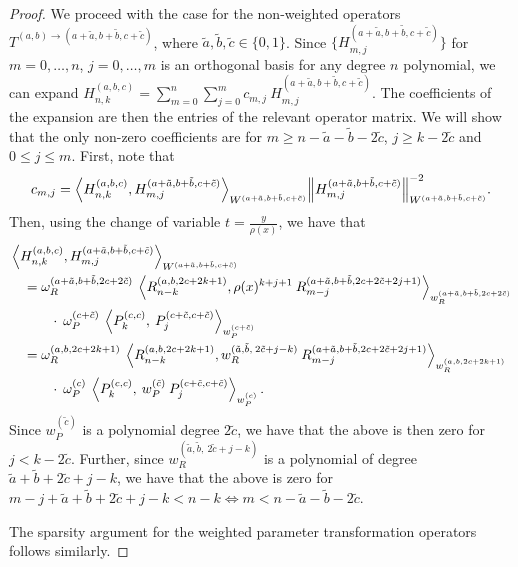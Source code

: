\documentclass[11pt, oneside]{article}   	%
\newcommand{\hdop}{H}
\newcommand{\jac}{{P}}
\newcommand{\genjac}{R}
\newcommand{\genjacnmk}{\genjac_{n-k}}
\newcommand{\genjacmmj}{\genjac_{m-j}}
\newcommand{\genjacw}{w_\genjac}
\newcommand{\jacw}{w_P}
\newcommand{\normgenjac}{\omega_\genjac}
\newcommand{\normjac}{\omega_P}
\newcommand{\hdopnkabc}{\hdop_{n,k}^{(a,b,c)}}
\begin{document}
\begin{proof}
We proceed with the case for the non-weighted operators $T^{(a,b)\to(a+\tilde{a},b+\tilde{b},c+\tilde{c})}$, where $\tilde{a}, \tilde{b}, \tilde{c} \in \{0,1\}$. Since $\{\hdop^{(a+\tilde{a},b+\tilde{b},c+\tilde{c})}_{m,j}\}$ for $m = 0,\dots,n$, $j = 0,\dots,m$ is an orthogonal basis for any degree $n$ polynomial, we can expand $\hdopnkabc = \sum_{m=0}^{n} \sum_{j=0}^m c_{m,j} \: \hdop^{(a+\tilde{a},b+\tilde{b},c+\tilde{c})}_{m,j}$. The coefficients of the expansion are then the entries of the relevant operator matrix. We will show that the only non-zero coefficients are for $m \ge n - \tilde{a} - \tilde{b} - 2\tilde{c} $, $j \ge k-2\tilde{c}$ and $0 \le j \le m$. First, note that
\begin{align*}
	c_{m,j} = {\ip< \hdopnkabc, \hdop^{(a+\tilde{a},b+\tilde{b},c+\tilde{c})}_{m,j} >_{W^{(a+\tilde{a},b+\tilde{b},c+\tilde{c})}}}{\norm{\hdop^{(a+\tilde{a},b+\tilde{b},c+\tilde{c})}_{m,j}}^{-2}_{W^{(a+\tilde{a},b+\tilde{b},c+\tilde{c})}}}.
\end{align*}
Then, using the change of variable $t = \frac{y}{\rho(x)}$, we have that
\begin{align*}
	&\ip< \hdopnkabc, \hdop^{(a+\tilde{a},b+\tilde{b},c+\tilde{c})}_{m,j} >_{W^{(a+\tilde{a},b+\tilde{b},c+\tilde{c})}} \\
	&\quad = \normgenjac^{(a+\tilde{a},b+\tilde{b},2c+2\tilde{c})} \: \ip< \genjacnmk^{(a,b,2c+2k+1)}, \rho(x)^{k+j+1} \: \genjacmmj^{(a+\tilde{a},b+\tilde{b},2c+2\tilde{c}+2j+1)} >_{\genjacw^{(a+\tilde{a},b+\tilde{b},2c+2\tilde{c})}} \\ 
	&\quad \quad \quad \cdot \: \normjac^{(c+\tilde{c})} \: \ip< \jac_k^{(c,c)}, \: \jac_{j}^{(c+\tilde{c},c+\tilde{c})} >_{\jacw^{(c+\tilde{c})}} \\
	&\quad= \normgenjac^{(a,b,2c+2k+1)} \: \ip< \genjacnmk^{(a,b,2c+2k+1)}, \genjacw^{(\tilde{a}, \tilde{b}, \: 2\tilde{c}+j-k)} \: \genjacmmj^{(a+\tilde{a},b+\tilde{b},2c+2\tilde{c}+2j+1)} >_{\genjacw^{(a,b,2c+2k+1)}} \\
	&\quad \quad \quad \cdot \: \normjac^{(c)} \: \ip< \jac_k^{(c,c)}, \: \jacw^{(\tilde{c})} \: \jac_{j}^{(c+\tilde{c},c+\tilde{c})} >_{\jacw^{(c)}}.
\end{align*}
Since $\jacw^{(\tilde{c})}$ is a polynomial degree $2\tilde{c}$, we have that the above is then zero for $j < k-2\tilde{c}$. Further, since $\genjacw^{(\tilde{a}, \tilde{b}, \: 2\tilde{c}+j-k)}$ is a polynomial of degree $\tilde{a}+\tilde{b}+2\tilde{c}+j-k$, we have that the above is zero for $m-j+\tilde{a}+\tilde{b}+2\tilde{c}+j-k < n-k \iff m < n - \tilde{a}-\tilde{b}-2\tilde{c}$.

The sparsity argument for the weighted parameter transformation operators follows similarly.
\end{proof}
\end{document}
